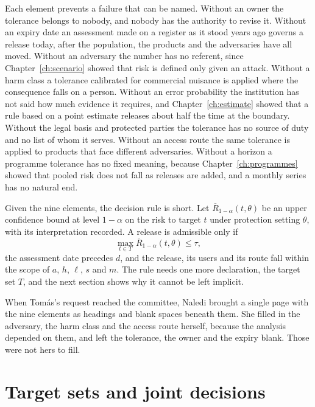 Each element prevents a failure that can be named. Without an owner the tolerance
belongs to nobody, and nobody has the authority to revise it. Without an expiry
date an assessment made on a register as it stood years ago governs a release
today, after the population, the products and the adversaries have all moved.
Without an adversary the number has no referent, since Chapter~\ref{ch:scenario}
showed that risk is defined only given an attack. Without a harm class a tolerance
calibrated for commercial nuisance is applied where the consequence falls on a
person. Without an error probability the institution has not said how much
evidence it requires, and Chapter~\ref{ch:estimate} showed that a rule based on a
point estimate releases about half the time at the boundary. Without the legal
basis and protected parties the tolerance has no source of duty and no list of whom
it serves. Without an access route the same tolerance is applied to products that
face different adversaries. Without a horizon a programme tolerance has no fixed
meaning, because Chapter~\ref{ch:programmes} showed that pooled risk does not fall
as releases are added, and a monthly series has no natural end.

Given the nine elements, the decision rule is short. Let
$\overline{R}_{1-\alpha}(t,\theta)$ be an upper confidence bound at level
$1-\alpha$ on the risk to target $t$ under protection setting $\theta$, with its
interpretation recorded. A release is admissible only if
\begin{equation}\label{c07:eq-admiss}
\max_{t \in T} \overline{R}_{1-\alpha}(t,\theta) \le \tau ,
\end{equation}
the assessment date precedes $d$, and the release, its users and its route fall
within the scope of $a$, $h$, $\ell$, $s$ and $m$. The rule needs one more
declaration, the target set $T$, and the next section shows why it cannot be left
implicit.

When Tom\'as's request reached the committee, Naledi brought a single page with the
nine elements as headings and blank spaces beneath them. She filled in the
adversary, the harm class and the access route herself, because the analysis
depended on them, and left the tolerance, the owner and the expiry blank. Those
were not hers to fill.

\section{Target sets and joint decisions}\label{c07:sec-targets}


